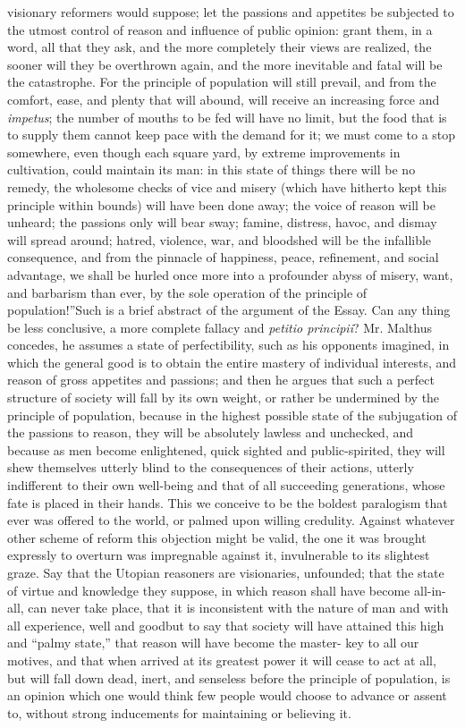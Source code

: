 visionary reformers would suppose; let the passions and appetites
be subjected to the utmost control of reason and influence of
public opinion: grant them, in a word, all that they ask, and the
more completely their views are realized, the sooner will they be
overthrown again, and the more inevitable and fatal will be the
catastrophe. For the principle of population will still prevail,
and from the comfort, ease, and plenty that will abound, will
receive an increasing force and \emph{impetus}; the number of
mouths to be fed will have no limit, but the food that is to
supply them cannot keep pace with the demand for it; we must come
to a stop somewhere, even though each square yard, by extreme
improvements in cultivation, could maintain its man: in this state
of things there will be no remedy, the wholesome checks of vice
and misery (which have hitherto kept this principle within bounds)
will have been done away; the voice of reason will be unheard; the
passions only will bear sway; famine, distress, havoc, and dismay
will spread around; hatred, violence, war, and bloodshed will be
the infallible consequence, and from the pinnacle of happiness,
peace, refinement, and social advantage, we shall be hurled once
more into a profounder abyss of misery, want, and barbarism than
ever, by the sole operation of the principle of
population!''\textemdash Such is a brief abstract of the argument
of the Essay.  Can any thing be less conclusive, a more complete
fallacy and \emph{petitio principii}? Mr. Malthus concedes, he
assumes a state of perfectibility, such as his opponents imagined,
in which the general good is to obtain the entire mastery of
individual interests, and reason of gross appetites and passions;
and then he argues that such a perfect structure of society will
fall by its own weight, or rather be undermined by the principle
of population, because in the highest possible state of the
subjugation of the passions to reason, they will be absolutely
lawless and unchecked, and because as men become enlightened,
quick sighted and public-spirited, they will shew themselves
utterly blind to the consequences of their actions, utterly
indifferent to their own well-being and that of all succeeding
generations, whose fate is placed in their hands. This we conceive
to be the boldest paralogism that ever was offered to the world,
or palmed upon willing credulity. Against whatever other scheme of
reform this objection might be valid, the one it was brought
expressly to overturn was impregnable against it, invulnerable to
its slightest graze. Say that the Utopian reasoners are
visionaries, unfounded; that the state of virtue and knowledge
they suppose, in which reason shall have become all-in-all, can
never take place, that it is inconsistent with the nature of man
and with all experience, well and good\textemdash but to say that
society will have attained this high and ``palmy state,'' that
reason will have become the master- key to all our motives, and
that when arrived at its greatest power it will cease to act at
all, but will fall down dead, inert, and senseless before the
principle of population, is an opinion which one would think few
people would choose to advance or assent to, without strong
inducements for maintaining or believing it.

